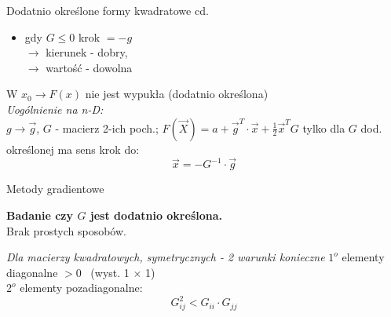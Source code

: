   \begin{frame}{Dodatnio określone formy kwadratowe cd.}

    \begin{block}{}
    	\begin{itemize}
	  	    \item gdy $G \leq 0$ krok $= -g$
	  	    \\$\rightarrow$ kierunek - dobry,
	  	    \\$\rightarrow$ wartość - dowolna
	    \end{itemize}
	    W $x_0 \rightarrow F(x)$ nie jest wypukła (dodatnio określona)
	    \medskip\\
	    \emph{Uogólnienie na n-D:}\\
	    $g \rightarrow \vec{g}$, $G$ - macierz 2-ich poch.;
	    $F(\vec X) = a + \vec{g}^T \cdot \vec{x} + \frac{1}{2} \vec{x}^T G$ tylko dla $G$ dod. określonej
	    ma sens krok do:
	    \begin{displaymath}
	  		\vec{x} = - G^{-1} \cdot \vec{g}
	    \end{displaymath}
    \end{block}

  \end{frame}

  \begin{frame}{Metody gradientowe}

    \begin{alertblock}{}
      \textbf{Badanie czy $G$ jest dodatnio określona.}\\
      Brak prostych sposobów.
    \end{alertblock}
    \begin{block}{\emph{Dla macierzy kwadratowych, symetrycznych - 2 warunki konieczne}}
      $1^o$ elementy diagonalne $> 0$ \ (wyst. 1 $\times$ 1)
      \\$2^o$ elementy pozadiagonalne:
      \begin{displaymath}
      		G_{ij}^2 < G_{ii} \cdot G_{jj}
      \end{displaymath}
    \end{block}

  \end{frame}

